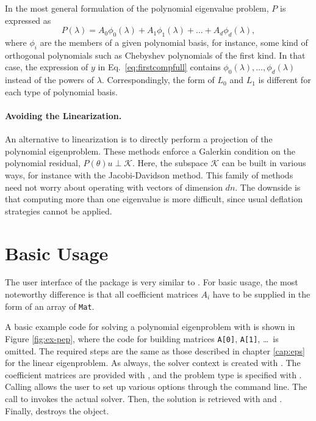 In the most general formulation of the polynomial eigenvalue problem, $P$ is expressed as
\begin{equation}
\label{eq:pepnonmon}
P(\lambda)=A_0\phi_0(\lambda)+A_1\phi_1(\lambda)+\dots+A_d\phi_d(\lambda),
\end{equation}
where $\phi_i$ are the members of a given polynomial basis, for instance, some kind of orthogonal polynomials such as Chebyshev polynomials of the first kind. In that case, the expression of $y$ in Eq.\ \ref{eq:firstcompfull} contains $\phi_0(\lambda),\dots,\phi_d(\lambda)$ instead of the powers of $\lambda$. Correspondingly, the form of $L_0$ and $L_1$ is different for each type of polynomial basis.

\paragraph{Avoiding the Linearization.}

An alternative to linearization is to directly perform a projection of the polynomial eigenproblem. These methods enforce a Galerkin condition on the polynomial residual, $P(\theta)u\perp \mathcal{K}$. Here, the subspace $\mathcal{K}$ can be built in various ways, for instance with the Jacobi-Davidson method. This family of methods need not worry about operating with vectors of dimension $dn$. The downside is that computing more than one eigenvalue is more difficult, since usual deflation strategies cannot be applied.

\section{Basic Usage}

The user interface of the  package is very similar to . For basic usage, the most noteworthy difference is that all coefficient matrices $A_i$ have to be supplied in the form of an array of \texttt{Mat}.

A basic example code for solving a polynomial eigenproblem with  is shown in Figure \ref{fig:ex-pep}, where the code for building matrices \texttt{A[0]}, \texttt{A[1]}, \ldots\ is omitted. The required steps are the same as those described in chapter \ref{cap:eps} for the linear eigenproblem. As always, the solver context is created with . The coefficient matrices are provided with , and the problem type is specified with . Calling  allows the user to set up various options through the command line. The call to  invokes the actual solver. Then, the solution is retrieved with  and . Finally,  destroys the object.

